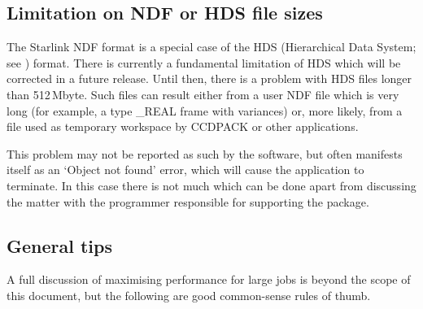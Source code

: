 \documentclass[twoside,11pt]{starlink}
\begin{document}
\subsection{Limitation on NDF or HDS file sizes}

The Starlink NDF format is a special case of the HDS (Hierarchical Data
System; see \cite{SUN92}) format.
There is currently a fundamental limitation of HDS which will be corrected
in a future release.
Until then, there is a problem with HDS files longer than 512\,Mbyte.
Such files can result either from a user NDF file which is very long
(for example, a 
type \_REAL frame with variances) or, more likely,
from a file used as temporary workspace by CCDPACK or other applications.

This problem may not be reported as such by the software,
but often manifests itself as an `Object not found' error,
which will cause the application to terminate.
In this case there is not much which can be done apart from
discussing the matter with the programmer
responsible for supporting the package.

\subsection{General tips}

A full discussion of maximising performance for large jobs
is beyond the scope of this document,
but the following are good common-sense rules of thumb.
\end{document}
